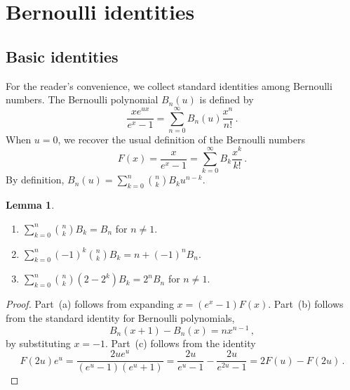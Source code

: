 \documentclass[11pt]{article}
\theoremstyle{definition}
\newtheorem{lemma}[definition]{Lemma}
\begin{document}
\appendix

\section{Bernoulli identities}\label{sec:B}
\subsection{Basic identities}
For the reader's convenience, we collect standard identities among Bernoulli numbers.
The Bernoulli polynomial $B_n(u)$ is defined by
\begin{equation*}
    \frac{xe^{ux}}{e^x-1} = \sum_{n=0}^\infty B_n(u) \frac{x^n}{n!}\,.
\end{equation*}
When $u=0$, we recover the usual definition of the Bernoulli numbers
\begin{equation}\label{eq:B}
    F(x) = \frac{x}{e^x-1} = \sum_{k=0}^\infty B_k \frac{x^k}{k!}\,.
\end{equation}
By definition, $B_n(u) = \sum_{k=0}^n \binom{n}{k}B_ku^{n-k}$.
\begin{lemma}\label{lem:1}
    \begin{enumerate}[label=(\alph*)]
        \item $\sum_{k=0}^n \binom{n}{k} B_k = B_n$ for $n\neq 1$.
        \item $\sum_{k=0}^n (-1)^k \binom{n}{k} B_k = n+(-1)^nB_n$.
        \item $\sum_{k=0}^n \binom{n}{k} (2-2^k) B_k = 2^n B_n$ for $n\neq 1$.
    \end{enumerate}
\end{lemma}
\begin{proof}
    Part~(a) follows from expanding $x= (e^x-1) F(x)$. Part~(b) follows from the standard identity for Bernoulli polynomials,
    \[
    B_n(x+1) - B_n(x) = nx^{n-1}\,,
    \]
    by substituting $x=-1$. Part~(c) follows from the identity
    \[
    F(2u) e^u
    =
    \frac{2u e^u}{(e^u-1)(e^u+1)}
    =
    \frac{2u}{e^u-1} - \frac{2u}{e^{2u}-1} = 2F(u) -F(2u)\,.
    \]
\end{proof}
\end{document}
